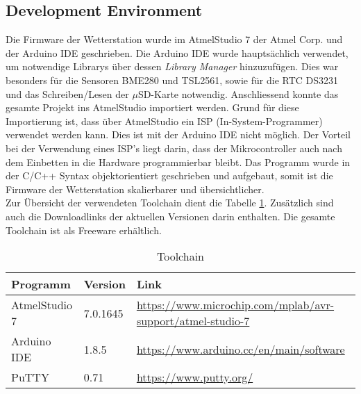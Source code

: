 \subsection{Development Environment}
\label{subsec:dev_envir}
Die Firmware der Wetterstation wurde im AtmelStudio 7 der Atmel Corp. und der Arduino IDE geschrieben. Die Arduino IDE wurde hauptsächlich verwendet, um notwendige Librarys über dessen \textit{Library Manager} hinzuzufügen. Dies war besonders für die Sensoren BME280 und TSL2561, sowie für die RTC DS3231 und das Schreiben/Lesen der $\mu$SD-Karte notwendig. Anschliessend konnte das gesamte Projekt ins AtmelStudio importiert werden. Grund für diese Importierung ist, dass über AtmelStudio ein ISP (In-System-Programmer) verwendet werden kann. Dies ist mit der Arduino IDE nicht möglich. Der Vorteil bei der Verwendung eines ISP's liegt darin, dass der Mikrocontroller auch nach dem Einbetten in die Hardware programmierbar bleibt. Das Programm wurde in der C/C++ Syntax objektorientiert geschrieben und aufgebaut, somit ist die Firmware der Wetterstation skalierbarer und übersichtlicher.\\

Zur Übersicht der verwendeten Toolchain dient die Tabelle \ref{tab:toolchain}. Zusätzlich sind auch die Downloadlinks der aktuellen Versionen darin enthalten. Die gesamte Toolchain ist als Freeware erhältlich.\\

\begin{table}[h]
\renewcommand{\arraystretch}{1.5}
\centering
\caption{Toolchain}
\label{tab:toolchain}
\begin{tabular}{llp{8cm}}
\toprule 
\textbf{Programm} & \textbf{Version} & \textbf{Link} \\ 
\toprule 
AtmelStudio 7 & 7.0.1645 & \url{https://www.microchip.com/mplab/avr-support/atmel-studio-7} \\ 
\hline 
Arduino IDE & 1.8.5 & \url{https://www.arduino.cc/en/main/software} \\ 
\hline 
PuTTY & 0.71 & \url{https://www.putty.org/} \\ 
\bottomrule 
\end{tabular} 
\end{table}

